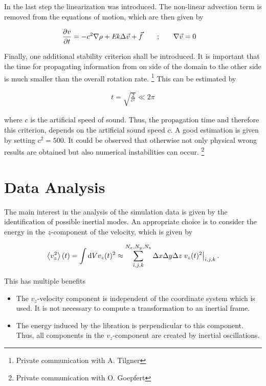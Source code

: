 In the last step the linearization was introduced.
The non-linear advection term is removed from the equations of motion, which
are then given by

\begin{align}
    \label{cone_theorie:rotns}
    \pdn[v]{t} = -c^2\nabla \rho + \Ekman \Delta \vec{v} + \vec{f} \qquad;& \qquad  \nabla \vec{v} = 0
\end{align}

Finally, one additional stability criterion shall be introduced.
It is important that the time for propagating information from on side of the domain
to the other side is much smaller than the overall rotation rate.
\footnote{Private communication with A. Tilgner}
This can be estimated by

\begin{align}
    t = \sqrt{\frac{2}{c^2}} \ll 2\pi
\end{align}

where $c$ is the artificial speed of sound.
Thus, the propagation time and therefore this criterion, depends on the artificial sound speed $c$.
A good estimation is given by setting $c^2 = 500$.
It could be observed that otherwise not only physical wrong results are obtained but also
numerical instabilities can occur.
\footnote{Private communication with O. Goepfert}

\newpage

\section{Data Analysis}

The main interest in the analysis of the simulation data is given by the identification of possible inertial modes.
An appropriate choice is to consider the energy in the $z$-component of the  velocity, which is given by

\begin{align}
    \left<v_z^2 \right>(t) =  \int \mathop{}\!\mathrm{d} V v_z(t)^2 \approx \sum_{i, j, k}^{N_x,N_y,N_z} \Delta x \Delta y \Delta z \left.v_z(t)^2 \right|_{i,j,k}.
\end{align}

This has multiple benefits

\begin{itemize}
    \item The $v_z$-velocity component is independent of the coordinate system which is used. It is not necessary
                to compute a transformation to an inertial frame.
    \item The energy induced by the libration is perpendicular to this component. Thus, all components
            in the $v_z$-component are created by inertial oscillations.
\end{itemize}

